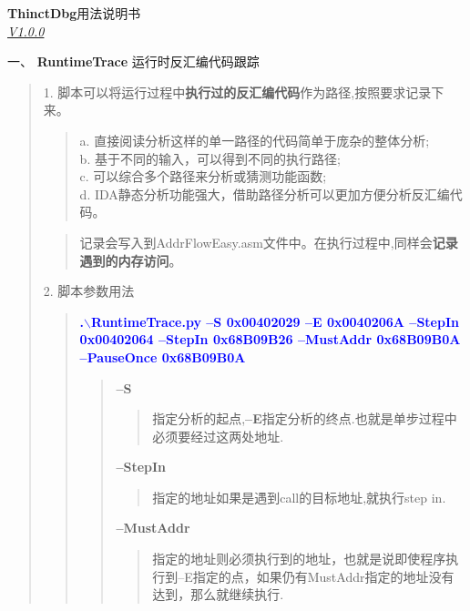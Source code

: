 \documentclass[AutoFakeBold,AutoFakeSlant]{article}
\begin{document}
	
	\vspace{1cm}
	\begin{center}
		\Huge 
		\textbf{ThinctDbg}用法说明书\\
		{\Large \textit{\underline{V1.0.0}}}
		
	\end{center}
	\vspace{2cm}
	
	\leftline
	\bigskip
	\begin{flushleft}
		\begin{LARGE}
			一、 \textbf{RuntimeTrace} 运行时反汇编代码跟踪
		\end{LARGE}
		
		\large 
		\linespread{1.6} \selectfont
		\begin{quote}
			1. 脚本可以将运行过程中\textbf{执行过的反汇编代码}作为路径,按照要求记录下来。\\
			\begin{quotation}
				a. 直接阅读分析这样的单一路径的代码简单于庞杂的整体分析;\\
				b. 基于不同的输入，可以得到不同的执行路径;\\
				c. 可以综合多个路径来分析或猜测功能函数;\\
				d. IDA静态分析功能强大，借助路径分析可以更加方便分析反汇编代码。
			\end{quotation}
			\begin{quotation}
			记录会写入到AddrFlowEasy.asm文件中。在执行过程中,同样会\textbf{记录遇到的内存访问}。
			\end{quotation}
		
			\vspace{1.2cm}
			
			\large 
			2. 脚本参数用法 \\
			\begin{quote}
				\textcolor{blue}{ \textbf{ \Large
				.$\backslash$RuntimeTrace.py --S 0x00402029 --E 0x0040206A --StepIn 0x00402064 --StepIn 0x68B09B26 --MustAddr 0x68B09B0A --PauseOnce 0x68B09B0A }}\\
				\begin{quote}
					\textbf{--S}
					\begin{quote} 指定分析的起点,\textbf{--E}指定分析的终点.也就是单步过程中必须要经过这两处地址.
					\end{quote}
					\textbf{--StepIn} 
					\begin{quote}
						指定的地址如果是遇到call的目标地址,就执行step in.
					\end{quote}
					\textbf{--MustAddr}
					\begin{quote}
					 指定的地址则必须执行到的地址，也就是说即使程序执行到--E指定的点，如果仍有MustAddr指定的地址没有达到，那么就继续执行.
					\end{quote}
				\end{quote}
			

\end{quote}
\end{quote}
\end{flushleft}
\end{document}

